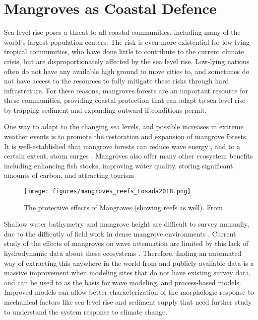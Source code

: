 \section{Mangroves as Coastal Defence}

Sea level rise poses a threat to all coastal communities, including many of the world's largest population centers. The risk is even more existential for low-lying tropical communities, who have done little to contribute to the current climate crisis, but are disproportionately affected by the sea level rise. Low-lying nations often do not have any available high ground to move cities to, and sometimes do not have access to the resources to fully mitigate these risks through hard infrastrcture. For these reasons, mangroves forests are an important resource for these communities, providing coastal protection that can adapt to sea level rise by trapping sediment and expanding outward if conditions permit.

One way to adapt to the changing sea levels, and possible increases in extreme weather events is to promote the restoration and expansion of mangrove forests. It is well-established that mangrove forests can reduce wave energy \cite{Maza2019,Menendez2020}, and to a certain extent, storm surges \cite{Montgomery2019a,Chen2021,Mcivor2012}. Mangroves also offer many other ecosystem benefits including enhancing fish stocks, improving water quality, storing significant amounts of carbon, and attracting tourism \cite{Atkinson2016b}

\begin{figure}[htbp]
      \centering
      \texttt{[image: figures/mangroves\_reefs\_Losada2018.png]}
      \caption{The protective effects of Mangroves (showing reefs as well). From \cite{Losada2018}}
      \label{mangrove-protection-diagram}
\end{figure}

Shallow water bathymetry and mangrove height are difficult to survey manually, due to the difficutly of field work in dense mangrove environments \cite{Gijsman2021}. Current study of the effects of mangroves on wave attenuation are limited by this lack of hydrodynamic data about these ecosystems \cite{Horstman2014}.  Therefore, finding an automated way of extracting this anywhere in the world from and publicly available data is a massive improvement when modeling sites that do not have existing survey data, and can be used to as the basis for wave modeling, and process-based models. Improved models can allow better characterization of the morphologic response to mechanical factors like sea level rise and sediment supply that need further study to understand the system response to climate change.


